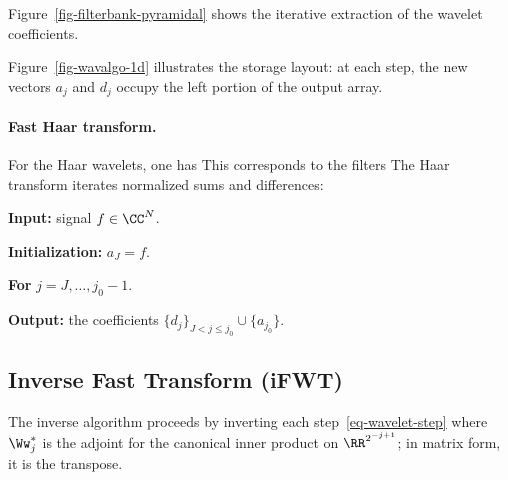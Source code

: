 Figure~\ref{fig-filterbank-pyramidal} shows the iterative extraction of the wavelet coefficients.
 
Figure~\ref{fig-wavalgo-1d} illustrates the storage layout: at each step, the new vectors $a_j$ and $d_j$ occupy the left portion of the output array.




  
\paragraph{Fast Haar transform.}

For the Haar wavelets, one has
This corresponds to the filters
The Haar transform iterates normalized sums and differences:
\begin{rs}
	\item \textbf{Input:} signal $f \in \CC^N$.
	\item \textbf{Initialization:} $a_J = f$.
	\item \textbf{For} $j=J,\ldots,j_0-1$.
	\item \textbf{Output:} the coefficients $\{d_j\}_{J<j\leq j_0} \cup \{ a_{j_0} \}$.
\end{rs}

                                                            
\subsection{Inverse Fast Transform (iFWT)}

The inverse algorithm proceeds by inverting each step~\eqref{eq-wavelet-step}
where $\Ww_j^{*}$ is the adjoint for the canonical inner product on $\RR^{2^{-j+1}}$; in matrix form, it is the transpose.

